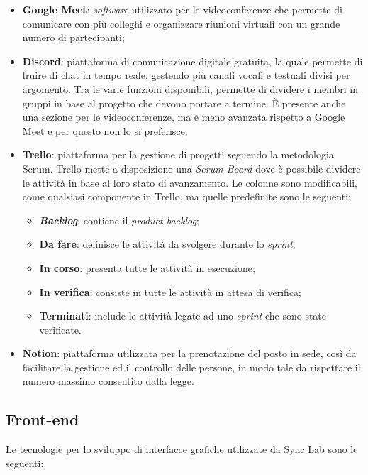\begin{itemize}
  \item \textbf{Google Meet}: \textit{software} utilizzato per le videoconferenze che permette di comunicare con più colleghi e organizzare riunioni virtuali con un grande numero di partecipanti;
  \item \textbf{Discord}: piattaforma di comunicazione digitale gratuita, la quale permette di fruire di chat in tempo reale, gestendo più canali vocali e testuali divisi per argomento. Tra le varie funzioni disponibili, permette di dividere i membri in gruppi in base al progetto che devono portare a termine. È presente anche una sezione per le videoconferenze, ma è meno avanzata rispetto a Google Meet e per questo non lo si preferisce;
  \item \textbf{Trello}: piattaforma per la gestione di progetti seguendo la metodologia Scrum. Trello mette a disposizione una \textit{Scrum Board} dove è possibile dividere le attività in base al loro stato di avanzamento. Le colonne sono modificabili, come qualsiasi componente in Trello, ma quelle predefinite sono le seguenti:
  \begin{itemize}
    \item \textbf{\textit{Backlog}}: contiene il \textit{product backlog};
    \item \textbf{Da fare}: definisce le attività da svolgere durante lo \textit{sprint};
    \item \textbf{In corso}: presenta tutte le attività in esecuzione;
    \item \textbf{In verifica}: consiste in tutte le attività in attesa di verifica;
    \item \textbf{Terminati}: include le attività legate ad uno \textit{sprint} che sono state verificate. 
  \end{itemize}
  \item \textbf{Notion}: piattaforma utilizzata per la prenotazione del posto in sede, così da facilitare la gestione ed il controllo delle persone, in modo tale da rispettare il numero massimo consentito dalla legge.
\end{itemize}

\subsection{Front-end}
Le tecnologie per lo sviluppo di interfacce grafiche utilizzate da Sync Lab sono le seguenti:

